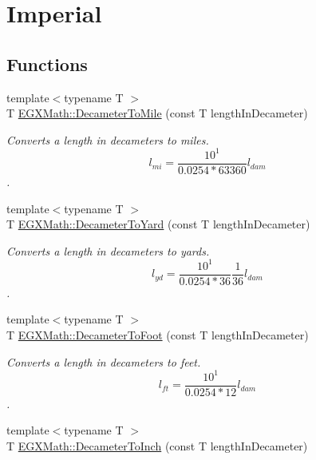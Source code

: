 \hypertarget{group___e_g_x_math-_conversions-_length_conversions-_decameter-_imperial}{}\section{Imperial}
\label{group___e_g_x_math-_conversions-_length_conversions-_decameter-_imperial}
\subsection*{Functions}
\begin{DoxyCompactItemize}
\item 
{\footnotesize template$<$typename T $>$ }\\T \mbox{\hyperlink{group___e_g_x_math-_conversions-_length_conversions-_decameter-_imperial_gac2a54223d869e01fc7a9c73fbf3f2906}{E\+G\+X\+Math\+::\+Decameter\+To\+Mile}} (const T length\+In\+Decameter)
\begin{DoxyCompactList}\small\item\em Converts a length in decameters to miles. \[ l_{mi}=\frac{10^{1}}{0.0254 * 63360} l_{dam} \]. \end{DoxyCompactList}\item 
{\footnotesize template$<$typename T $>$ }\\T \mbox{\hyperlink{group___e_g_x_math-_conversions-_length_conversions-_decameter-_imperial_ga42a81b14a91ba9ddb4967faa55b6a3a0}{E\+G\+X\+Math\+::\+Decameter\+To\+Yard}} (const T length\+In\+Decameter)
\begin{DoxyCompactList}\small\item\em Converts a length in decameters to yards. \[ l_{yd}= \frac{10^{1}}{0.0254 * 36} \frac{1}{36} l_{dam} \]. \end{DoxyCompactList}\item 
{\footnotesize template$<$typename T $>$ }\\T \mbox{\hyperlink{group___e_g_x_math-_conversions-_length_conversions-_decameter-_imperial_gad2829e03e1755db4f7f9b21070ecaef6}{E\+G\+X\+Math\+::\+Decameter\+To\+Foot}} (const T length\+In\+Decameter)
\begin{DoxyCompactList}\small\item\em Converts a length in decameters to feet. \[ l_{ft}= \frac{10^{1}}{0.0254 * 12} l_{dam} \]. \end{DoxyCompactList}\item 
{\footnotesize template$<$typename T $>$ }\\T \mbox{\hyperlink{group___e_g_x_math-_conversions-_length_conversions-_decameter-_imperial_ga246ab50e821640008d965b5690226df5}{E\+G\+X\+Math\+::\+Decameter\+To\+Inch}} (const T length\+In\+Decameter)

\end{DoxyCompactItemize}
